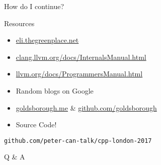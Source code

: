 
\begin{slide}{}
  \fontsize{32}{32}\selectfont
  \color{llvmblue}
  How do I continue?
\end{slide}

\begin{slide}{Resources}
  \begin{itemize}
      \item \url{eli.thegreenplace.net}
      \item \url{clang.llvm.org/docs/InternalsManual.html}
      \item \url{llvm.org/docs/ProgrammersManual.html}
      \item Random blogs on Google
      \item \url{goldsborough.me} \& \url{github.com/goldsborough}
      \item Source Code!
  \end{itemize}
  \pause
  \vspace{0.75cm}
  \texttt{github.com/peter-can-talk/cpp-london-2017}
\end{slide}

%

\begin{slide}{}
  \vspace{0.5cm}
  \fontsize{48}{48}\selectfont
  \color{llvmblue}
  Q \& A
\end{slide}
